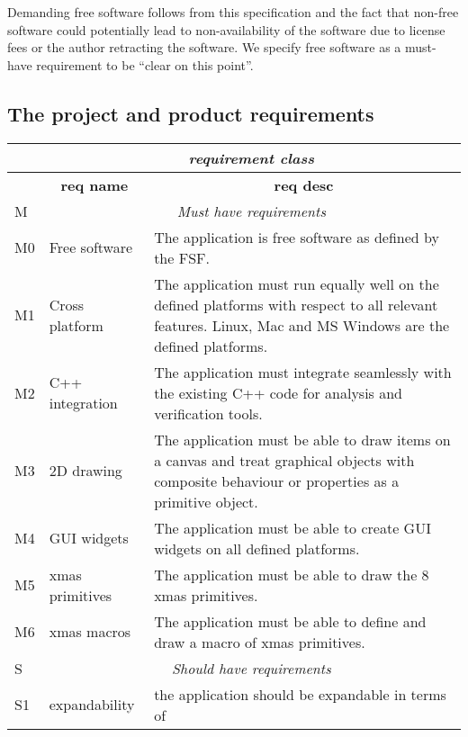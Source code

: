 \vspace{1em}

\noindent Demanding free software follows from this specification and the fact
that non-free software could potentially lead to non-availability of the
software due to license fees or the author retracting the software. We specify
free software as a must-have requirement to be ``clear on this point''.

\subsection{The project and product requirements}

\begin{center}
    \small\sf
    \begin{tabular}{|l|p{7em}|p{23em}|}
	\hline
	        & \multicolumn{2}{c|}{\sf\em\large requirement class}\\\hline
	{}      & \multicolumn{1}{c|}{\bf req name} & \multicolumn{1}{c|}{\bf req desc}\\\hline
	M	& \multicolumn{2}{c|}{\sf\emph{\large Must have requirements}}
		\\\hline
	M0	& Free software  & The application is free software as defined by the FSF.
		\\\hline
	M1	& Cross platform & The application must run equally well on the
				    defined platforms with respect to all relevant features.
				    Linux, Mac and MS Windows are the defined platforms.
		\\\hline
	M2	& C++ integration & The application must integrate seamlessly with
				the existing C++ code for analysis and verification tools.
		\\\hline
	M3	& 2D drawing & The application must be able to draw items on a
				canvas and treat graphical objects with composite
				behaviour or properties as a primitive object.
		\\\hline
	M4	& GUI widgets & The application must be able to create GUI widgets
				on all defined platforms.
		\\\hline
	M5      & xmas primitives & The application must be able to draw the 8 xmas
				    primitives.
		\\\hline
	M6	& xmas macros     & The application must be able to define and draw
				    a macro of xmas primitives.
		\\\hline
	S	& \multicolumn{2}{c|}{\sf\emph{\large Should have requirements}}
		\\\hline
	S1	& expandability & the application should be expandable in terms of

\end{tabular}
\end{center}
